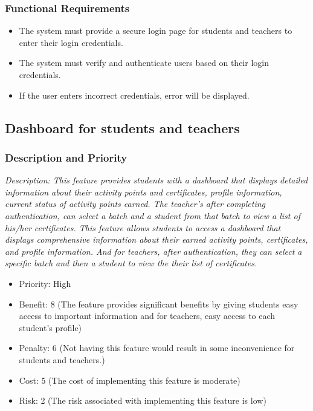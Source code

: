 \documentclass{article}
\begin{document}
\subsubsection{Functional Requirements}
\begin{itemize}
\item The system must provide a secure login page for students and teachers to enter their login credentials.
\item The system must verify and authenticate users based on their login credentials.
\item If the user enters incorrect credentials, error will be displayed.
\end{itemize}




\subsection{Dashboard for students and teachers}
\subsubsection{Description and Priority}
\emph{Description: This feature provides students with a dashboard that displays detailed information about their activity points and certificates, profile information, current status of activity points earned. The teacher's after completing authentication, can select a batch and a student from that batch to view a list of his/her certificates.
This feature allows students to access a dashboard that displays comprehensive information about their earned activity points, certificates, and profile information. And for teachers, after authentication, they can select a specific batch and then a student to view the their list of certificates.}
\begin{itemize}
  \item Priority: High
  \item Benefit:  8 (The feature provides significant benefits by giving students easy access to important information and for teachers, easy access to each student's profile)
  \item Penalty: 6 (Not having this feature would result in some inconvenience for students and teachers.)
  \item Cost:  5 (The cost of implementing this feature is moderate)
  \item Risk: 2 (The risk associated with implementing this feature is low)
\end{itemize}
\end{document}
